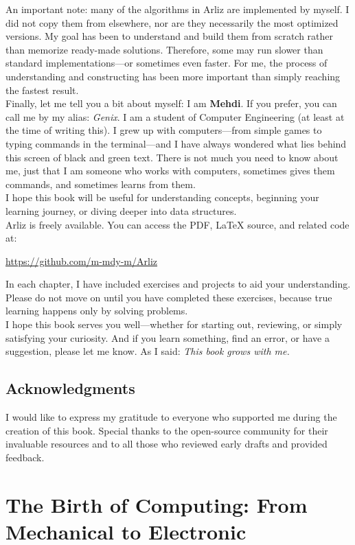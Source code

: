 \documentclass[12pt, oneside]{book}
\begin{document}
	An important note: many of the algorithms in Arliz are implemented by myself. I did not copy them from elsewhere, nor are they necessarily the most optimized versions. My goal has been to understand and build them from scratch rather than memorize ready-made solutions. Therefore, some may run slower than standard implementations—or sometimes even faster. For me, the process of understanding and constructing has been more important than simply reaching the fastest result.\\	
	Finally, let me tell you a bit about myself:  
	I am \textbf{Mehdi}. If you prefer, you can call me by my alias: \emph{Genix}. I am a student of Computer Engineering (at least at the time of writing this). I grew up with computers—from simple games to typing commands in the terminal—and I have always wondered what lies behind this screen of black and green text. There is not much you need to know about me, just that I am someone who works with computers, sometimes gives them commands, and sometimes learns from them.\\	
	I hope this book will be useful for understanding concepts, beginning your learning journey, or diving deeper into data structures. \\	
	Arliz is freely available. You can access the PDF, LaTeX source, and related code at:  
	\begin{center}
		\url{https://github.com/m-mdy-m/Arliz}
	\end{center}
	In each chapter, I have included exercises and projects to aid your understanding. Please do not move on until you have completed these exercises, because true learning happens only by solving problems.\\	
	I hope this book serves you well—whether for starting out, reviewing, or simply satisfying your curiosity. And if you learn something, find an error, or have a suggestion, please let me know. As I said:
	\emph{This book grows with me.}
	
	\chapter*{Acknowledgments}
	I would like to express my gratitude to everyone who supported me during the creation of this book. Special thanks to the open-source community for their invaluable resources and to all those who reviewed early drafts and provided feedback.
	
	\mainmatter
	\part{The Birth of Computing: From Mechanical to Electronic}
\end{document}
